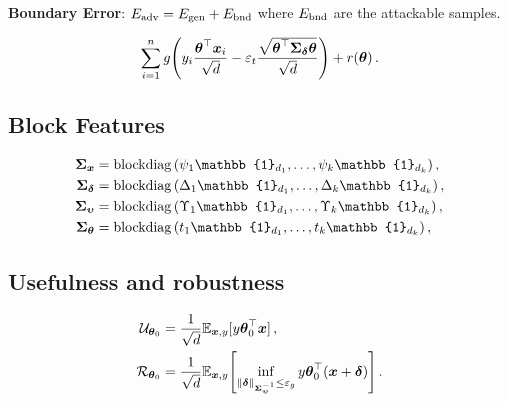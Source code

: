 \documentclass[a0paper,fleqn]{betterportraitposter}
\theoremstyle{plain}
\theoremstyle{definition}
\theoremstyle{remark}
\begin{document}
{\begin{multicols}{3}
\textbf{Boundary Error}: 
\(E_{\mathrm{adv}} = E_{\mathrm{gen}} + E_{\mathrm{bnd}}\) where \(E_{\mathrm{bnd}}\) are the attackable samples.



\begin{equation}\label{eq:modified-minimisation-problem}
    \sum_{i = 1}^{n} 
    g \qty(
        y_{i} \frac{\boldsymbol{\theta}^\top \boldsymbol{x}_{i}}{\sqrt{d}} 
        - \varepsilon_t \frac{\sqrt{\boldsymbol{\theta}^\top \boldsymbol{\Sigma}_{\boldsymbol{\delta}} \boldsymbol{\theta}}}{\sqrt{d}} 
    ) 
    + r(\boldsymbol{\theta}) \,.
\end{equation}

\subsection{Block Features}

\begin{equation}
\begin{aligned}
   \Sigmax &= \operatorname{blockdiag}\qty( \psi_1 \mathbb{1}_{d_1}, \dots, \psi_k \mathbb{1}_{d_k} ) \,, \\
   \Sigmadelta &= \operatorname{blockdiag}\qty( \Delta_1 \mathbb{1}_{d_1}, \dots, \Delta_k \mathbb{1}_{d_k} ) \,, \\
   \Sigmaupsilon &= \operatorname{blockdiag}\qty( \Upsilon_1 \mathbb{1}_{d_1},  \dots, \Upsilon_k \mathbb{1}_{d_k} ) \,, \\
   \Sigmatheta &= \operatorname{blockdiag}\qty( t_1 \mathbb{1}_{d_1}, \dots, t_k \mathbb{1}_{d_k} ) \,,
\end{aligned}
\end{equation}

\subsection{Usefulness and robustness}
\begin{align}
   \mathcal{U}_{\boldsymbol{\theta}_0}
   &= \frac{1}{\sqrt{d}} \mathbb{E}_{\boldsymbol{x}, y}[y \boldsymbol{\theta}_0^\top \boldsymbol{x} ] \,, \label{eq:mt-usefulness-def} \\
   \mathcal{R}_{\boldsymbol{\theta}_0} &= \frac{1}{\sqrt{d}} \mathbb{E}_{\boldsymbol{x}, y}\qty[
       \inf_{\norm{\boldsymbol{\delta}}_{\boldsymbol{\Sigma}_{\boldsymbol{\upsilon}}^{-1}}  \leq \varepsilon_g} y \boldsymbol{\theta}_0^\top ( \boldsymbol{x} + \boldsymbol{\delta})
   ]\,. \label{eq:mt-robustness-def}
\end{align}


\end{multicols}}
\end{document}
